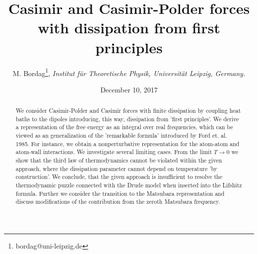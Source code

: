 \documentclass[notitlepage,prd,aps,longbibliography,twocolumn]{revtex4-1}
\begin{document}
%
\title{%
Casimir and Casimir-Polder forces with dissipation from first principles}
\author{M. Bordag\footnote{bordag@uni-leipzig.de},
\footnotesize{{\sl Institut f\"ur Theoretische Physik, Universit\"at Leipzig, Germany.}}}
%
\date{December 10, 2017
}

%
\begin{abstract}
We consider Casimir-Polder and Casimir forces with finite dissipation by coupling heat baths to the dipoles introducing, this way, dissipation from 'first principles'. We derive a representation of the free energy as an integral over real frequencies, which can be viewed as an generalization of the 'remarkable formula' introduced by Ford et. al. 1985. For instance, we obtain a nonperturbative representation for the atom-atom and atom-wall interactions. We investigate several limiting cases. From the limit $T\to0$ we show that the third law of thermodynamics cannot be violated within the given approach, where the dissipation parameter cannot depend on temperature 'by construction'. We conclude, that the given approach is insufficient to resolve the thermodynamic puzzle connected with the Drude model when inserted into the Lifshitz formula. Further we consider the transition to the Matsubara representation and discuss modifications of the contribution from the zeroth Matsubara frequency.
\end{abstract}
\maketitle   %
\end{document}
